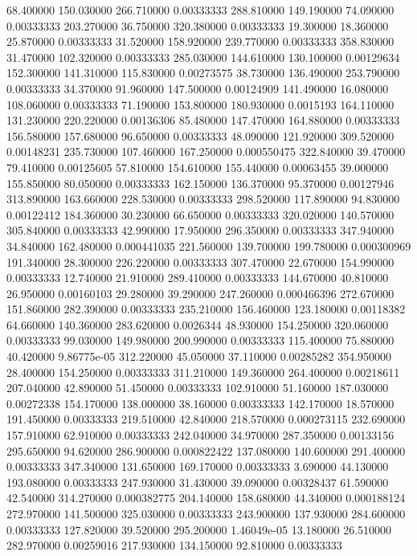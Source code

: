 68.400000	150.030000	266.710000	0.00333333
288.810000	149.190000	74.090000	0.00333333
203.270000	36.750000	320.380000	0.00333333
19.300000	18.360000	25.870000	0.00333333
31.520000	158.920000	239.770000	0.00333333
358.830000	31.470000	102.320000	0.00333333
285.030000	144.610000	130.100000	0.00129634
152.300000	141.310000	115.830000	0.00273575
38.730000	136.490000	253.790000	0.00333333
34.370000	91.960000	147.500000	0.00124909
141.490000	16.080000	108.060000	0.00333333
71.190000	153.800000	180.930000	0.0015193
164.110000	131.230000	220.220000	0.00136306
85.480000	147.470000	164.880000	0.00333333
156.580000	157.680000	96.650000	0.00333333
48.090000	121.920000	309.520000	0.00148231
235.730000	107.460000	167.250000	0.000550475
322.840000	39.470000	79.410000	0.00125605
57.810000	154.610000	155.440000	0.00063455
39.000000	155.850000	80.050000	0.00333333
162.150000	136.370000	95.370000	0.00127946
313.890000	163.660000	228.530000	0.00333333
298.520000	117.890000	94.830000	0.00122412
184.360000	30.230000	66.650000	0.00333333
320.020000	140.570000	305.840000	0.00333333
42.990000	17.950000	296.350000	0.00333333
347.940000	34.840000	162.480000	0.000441035
221.560000	139.700000	199.780000	0.000300969
191.340000	28.300000	226.220000	0.00333333
307.470000	22.670000	154.990000	0.00333333
12.740000	21.910000	289.410000	0.00333333
144.670000	40.810000	26.950000	0.00160103
29.280000	39.290000	247.260000	0.000466396
272.670000	151.860000	282.390000	0.00333333
235.210000	156.460000	123.180000	0.00118382
64.660000	140.360000	283.620000	0.0026344
48.930000	154.250000	320.060000	0.00333333
99.030000	149.980000	200.990000	0.00333333
115.400000	75.880000	40.420000	9.86775e-05
312.220000	45.050000	37.110000	0.00285282
354.950000	28.400000	154.250000	0.00333333
311.210000	149.360000	264.400000	0.00218611
207.040000	42.890000	51.450000	0.00333333
102.910000	51.160000	187.030000	0.00272338
154.170000	138.000000	38.160000	0.00333333
142.170000	18.570000	191.450000	0.00333333
219.510000	42.840000	218.570000	0.000273115
232.690000	157.910000	62.910000	0.00333333
242.040000	34.970000	287.350000	0.00133156
295.650000	94.620000	286.900000	0.000822422
137.080000	140.600000	291.400000	0.00333333
347.340000	131.650000	169.170000	0.00333333
3.690000	44.130000	193.080000	0.00333333
247.930000	31.430000	39.090000	0.00328437
61.590000	42.540000	314.270000	0.000382775
204.140000	158.680000	44.340000	0.000188124
272.970000	141.500000	325.030000	0.00333333
243.900000	137.930000	284.600000	0.00333333
127.820000	39.520000	295.200000	1.46049e-05
13.180000	26.510000	282.970000	0.00259016
217.930000	134.150000	92.810000	0.00333333
